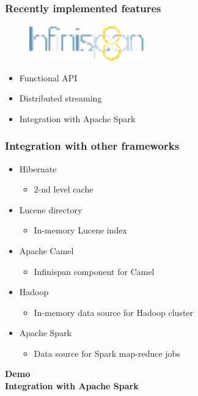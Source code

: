 \documentclass[10pt,utf8]{beamer}
\begin{document}
\begin{frame}
  \frametitle{Recently implemented features}
	\begin{figure}
		\centering
		\includegraphics[width=5cm]{./img/infinispan8.eps}
	\end{figure}
  \begin{itemize}
    \item Functional API
		\item Distributed streaming
		\item Integration with Apache Spark
  \end{itemize}
\end{frame}

\begin{frame}
  \frametitle{Integration with other frameworks}
  \begin{itemize}
    \item Hibernate
		\begin{itemize}
			\item 2-nd level cache
		\end{itemize}
		\item Lucene directory
		\begin{itemize}
		 \item In-memory Lucene index 
		\end{itemize}
		\item Apache Camel
		\begin{itemize}
		 \item Infinispan component for Camel
		\end{itemize}
		\item Hadoop
		\begin{itemize}
			\item In-memory data source for Hadoop cluster
		\end{itemize}
		\item Apache Spark
		\begin{itemize}
			\item Data source for Spark map-reduce jobs
		\end{itemize}
  \end{itemize}
\end{frame}

\begin{frame}
	\centering
	\huge{\textbf{Demo}} \\
	\vspace{1cm}
	\huge{\textbf{Integration with Apache Spark}}
\end{frame}
\end{document}
